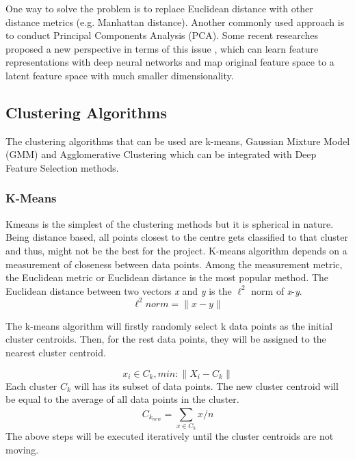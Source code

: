 \documentclass[12pt]{article}
\begin{document}
One way to solve the problem is to replace Euclidean distance with other distance metrics (e.g. Manhattan distance). Another commonly used approach is to conduct Principal Components Analysis (PCA). Some recent researches proposed a new perspective in terms of this issue\cite{vincent2010stacked} \cite{xie2016unsupervised}\cite{tian2017deepcluster}, which can learn feature representations with deep neural networks and map original feature space to a latent feature space with much smaller dimensionality. 

\subsection{Clustering Algorithms}
The clustering algorithms that can be used are k-means, Gaussian Mixture Model (GMM) and Agglomerative Clustering which can be integrated with Deep Feature Selection methods. \\
\subsubsection{K-Means}
Kmeans is the simplest of the clustering methods but it is spherical in nature. Being distance based, all points closest to the centre gets classified to that cluster and thus, might not be the best for the project. K-means algorithm depends on a measurement of closeness between data points. Among the measurement metric, the Euclidean metric or Euclidean distance is the most popular method. The Euclidean distance between two vectors \textit{x} and \textit{y} is the $\ell^2$ norm of \textit{x}-\textit{y}.
\begin{equation}
\ell^2 norm= \|x-y\|
\end{equation}

The k-means algorithm will firstly randomly select k data points as the initial cluster centroids. Then, for the rest data points, they will be assigned to the nearest cluster centroid. 

\begin{equation}
 	x_i\in C_k,min: \|X_i-C_k\|
\end{equation}
Each cluster $C_k$ will has its subset of data points. The new cluster centroid will be equal to the average of all data points in the cluster.
\begin{equation}
 	C_{k_{new}}=\sum\limits_{x\in C_k}^{}x/n
\end{equation}
The above steps will be executed iteratively until the cluster centroids are not moving.\\  
\end{document}
